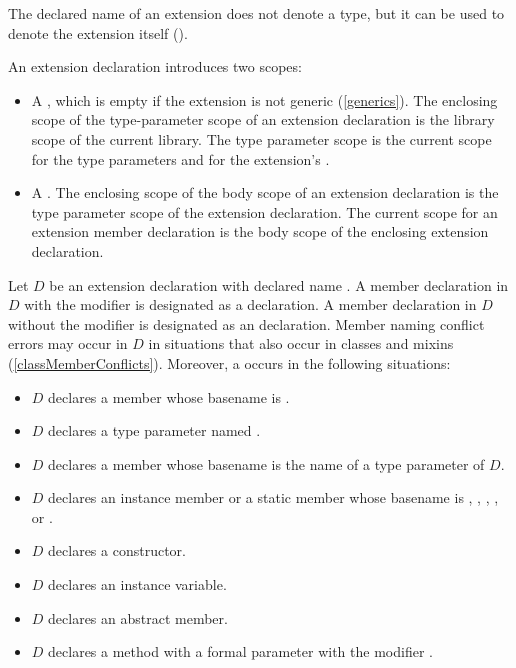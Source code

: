 \documentclass[makeidx]{article}
\begin{document}
\LMHash{}%
The declared name of an extension does not denote a type,
but it can be used to denote the extension itself
().

\LMHash{}%
An extension declaration introduces two scopes:
\begin{itemize}
\item
  A ,
  which is empty if the extension is not generic (\ref{generics}).
  The enclosing scope of the type-parameter scope of an extension declaration is
  the library scope of the current library.
  The type parameter scope is the current scope for
  the type parameters and for the extension's \ON{} .
\item
  A .
  The enclosing scope of the body scope of an extension declaration is
  the type parameter scope of the extension declaration.
  The current scope for an extension member declaration is
  the body scope of the enclosing extension declaration.
\end{itemize}

\LMHash{}%
%
Let $D$ be an extension declaration with declared name .
A member declaration in $D$ with the modifier \STATIC{} is designated as a
declaration.
%
A member declaration in $D$ without the modifier \STATIC{} is designated as an
declaration.
%
Member naming conflict errors may occur in $D$
in situations that also occur in classes and mixins
(\ref{classMemberConflicts}).
Moreover, a  occurs in the following situations:

\begin{itemize}
\item $D$ declares a member whose basename is .
\item $D$ declares a type parameter named .
\item $D$ declares a member whose basename is the name of a type parameter
  of $D$.
\item $D$ declares an instance member or a static member whose basename is
  , , , ,
  or \lit{==}.
\item $D$ declares a constructor.
\item $D$ declares an instance variable.
\item $D$ declares an abstract member.
\item $D$ declares a method with a formal parameter
  with the modifier \COVARIANT.
\end{itemize}
\end{document}
